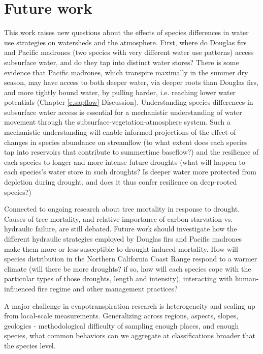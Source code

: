 \section{Future work}

This work raises new questions about the effects of species differences in water use strategies on watersheds and the atmosphere.  First, where do Douglas firs and Pacific madrones (two species with very different water use patterns) access subsurface water, and do they tap into distinct water stores?  There is some evidence that Pacific madrones, which transpire maximally in the summer dry season, may have access to both deeper water, via deeper roots than Douglas firs, and more tightly bound water, by pulling harder, i.e. reaching lower water potentials (Chapter \ref{c.sapflow} Discussion).  Understanding species differences in subsurface water access is essential for a mechanistic understanding of water movement through the subsurface-vegetation-atmosphere system.  Such a mechanistic understanding will enable informed projections of the effect of changes in species abundance on streamflow (to what extent does each species tap into reservoirs that contribute to summertime baseflow?) and the resilience of each species to longer and more intense future droughts (what will happen to each species's water store in such droughts?  Is deeper water more protected from depletion during drought, and does it thus confer resilience on deep-rooted species?)

Connected to ongoing research about tree mortality in response to drought.  Causes of tree mortality, and relative importance of carbon starvation vs. hydraulic failure, are still debated.  Future work should investigate how the different hydraulic strategies employed by Douglas firs and Pacific madrones make them more or less susceptible to drought-induced mortality.  How will species distribution in the Northern California Coast Range respond to a warmer climate (will there be more droughts? if so, how will each species cope with the particular types of those droughts, length and intensity), interacting with human-influenced fire regime and other management practices?

A major challenge in evapotranspiration research is heterogeneity and scaling up from local-scale measurements.  Generalizing across regions, aspects, slopes, geologies - methodological difficulty of sampling enough places, and enough species, what common behaviors can we aggregate at classifications broader that the species level.  
